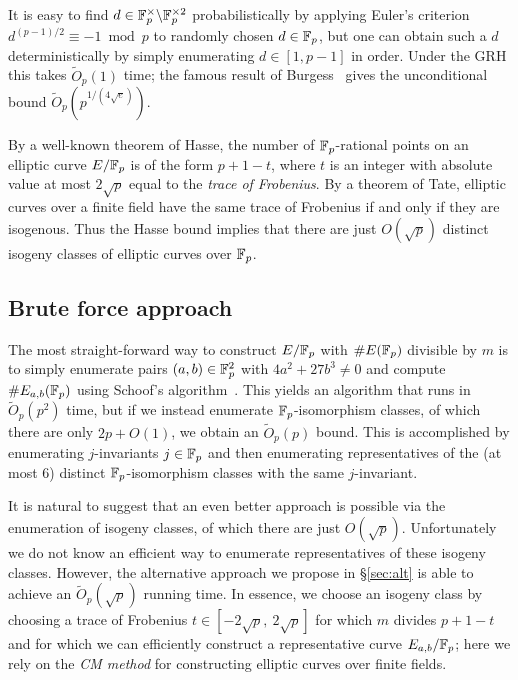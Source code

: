 \documentclass[12pt]{amsart}
\begin{document}
It is easy to find $d\in \mathbb{F}_p^\times\backslash \mathbb{F}_p^{\times 2}$ probabilistically by applying Euler's criterion $d^{(p-1)/2}\equiv -1\bmod p$ to randomly chosen $d\in \mathbb{F}_p$, but one can obtain such a $d$ deterministically by simply enumerating $d\in[1,p-1]$ in order.
Under the GRH this takes $\widetilde{O}_p(1)$ time; 
the famous result of Burgess~\cite{Burg1} gives the unconditional bound $\widetilde{O}_p(p^{1/(4\sqrt{e})})$.


By a well-known theorem of Hasse, the number of $\mathbb{F}_p$-rational points on an elliptic curve $E/\mathbb{F}_p$ is of the form $p+1-t$, where $t$ is an integer with absolute value at most $2\sqrt{p}$ equal to the {\it trace of Frobenius\/}.
By a theorem of Tate, elliptic curves over a finite field have the same trace of Frobenius if and only if they are isogenous.
Thus the Hasse bound implies that there are just $O(\sqrt{p})$ distinct isogeny classes of elliptic curves over $\mathbb{F}_p$.

\subsection{Brute force approach}\label{sec:brute}

The most straight-forward way to construct $E/\mathbb{F}_p$ with $\#E(\mathbb{F}_p)$ divisible by $m$ is to simply enumerate pairs $(a,b)\in\mathbb{F}_p^2$ with $4a^2+27b^3\ne 0$ and compute $\#E_{a,b}(\mathbb{F}_p)$ using Schoof's algorithm~\cite{Schoof}. 
This yields an algorithm that runs in $\widetilde{O}_p(p^2)$ time, but if we instead enumerate $\mathbb{F}_p$-isomorphism classes, of which there are only $2p+O(1)$, we obtain an $\widetilde{O}_p(p)$ bound.
This is accomplished by enumerating $j$-invariants $j\in\mathbb{F}_p$ and then enumerating representatives of the (at most 6) distinct $\mathbb{F}_p$-isomorphism classes with the same $j$-invariant.

It is natural to suggest that an even better approach 
is possible via the  enumeration of isogeny classes, 
of which there are just $O(\sqrt{p})$.
Unfortunately we do not know an efficient way to enumerate representatives of these isogeny classes.
However, the alternative approach we propose in \S\ref{sec:alt} is able to achieve an $\widetilde{O}_p(\sqrt{p})$ running time.
In essence, we choose an isogeny class by choosing a trace of Frobenius $t\in[-2\sqrt{p},\ 2\sqrt{p}]$ for which $m$ divides $p+1-t$ and for which we can efficiently construct a representative curve $E_{a,b}/\mathbb{F}_p$; here we rely on the \emph{CM method}
 for constructing elliptic curves over finite fields.
\end{document}
